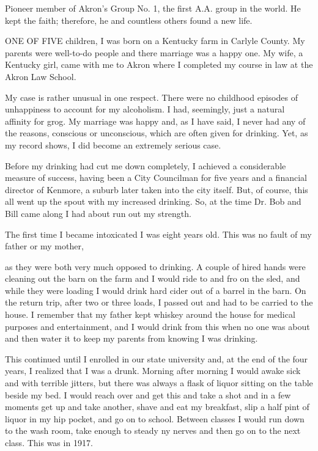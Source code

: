 

\bbChapterPreamble




\begin{biblechapter}
    Pioneer member of Akron’s Group No. 1, 
    the first A.A. group in the world.
\verse He kept the faith; 
    therefore, he and countless others found a new life.
\end{biblechapter}


\begin{biblechapter}
    ONE OF FIVE children, 
    I was born on a Kentucky farm in Carlyle County.
\verse My parents were well-to-do people and there marriage was a happy one.
\verse My wife, a Kentucky girl, 
    came with me to Akron 
    where I completed my course in law at the Akron Law School.

\verse My case is rather unusual in one respect. There were no childhood episodes of unhappiness to account for my alcoholism. I had, seemingly, just a natural affinity for grog. My marriage was happy and, as I have said, I never had any of the reasons, conscious or unconscious, which are often given for drinking. Yet, as my record shows, I did become an extremely serious case.

Before my drinking had cut me down completely, I achieved a considerable measure of success, having been a City Councilman for five years and a financial director of Kenmore, a suburb later taken into the city itself. But, of course, this all went up the spout with my increased drinking. So, at the time Dr. Bob and Bill came along I had about run out my strength.

The first time I became intoxicated I was eight years old. This was no fault of my father or my mother,

as they were both very much opposed to drinking. A couple of hired hands were cleaning out the barn on the farm and I would ride to and fro on the sled, and while they were loading I would drink hard cider out of a barrel in the barn. On the return trip, after two or three loads, I passed out and had to be carried to the house. I remember that my father kept whiskey around the house for medical purposes and entertainment, and I would drink from this when no one was about and then water it to keep my parents from knowing I was drinking.

This continued until I enrolled in our state university and, at the end of the four years, I realized that I was a drunk. Morning after morning I would awake sick and with terrible jitters, but there was always a flask of liquor sitting on the table beside my bed. I would reach over and get this and take a shot and in a few moments get up and take another, shave and eat my breakfast, slip a half pint of liquor in my hip pocket, and go on to school. Between classes I would run down to the wash room, take enough to steady ny nerves and then go on to the next class. This was in 1917.


\end{biblechapter}
